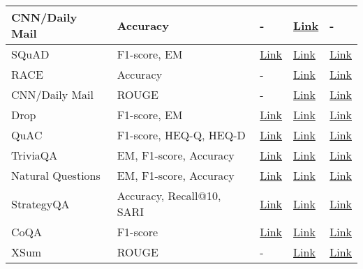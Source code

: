 \documentclass[conference]{IEEEtran}
\begin{document}
\begin{table*}
\begin{tabular}{|m{2.5cm}|m{4cm}|m{2cm}|m{2cm}|m{2cm}|}
        CNN/Daily Mail \cite{chen2016thorough} & Accuracy & - & \href{https://github.com/danqi/rc-cnn-dailymail}{Link}  & - \\ \hline
        SQuAD &  F1-score, EM  & \href{https://rajpurkar.github.io/SQuAD-explorer/ }{Link} & \href{https://rajpurkar.github.io/SQuAD-explorer/ }{Link} &  \href{https://paperswithcode.com/dataset/squad}{Link}  \\ \hline
        RACE & Accuracy &  - & \href{https://www.cs.cmu.edu/\~glai1/data/race/}{Link} & \href{https://paperswithcode.com/sota/reading-comprehension-on-race}{Link}  \\ \hline
        CNN/Daily Mail \cite{nallapati-etal-2016-abstractive} & ROUGE &  - & \href{https://github.com/abisee/cnn-dailymail}{Link}  & \href{https://paperswithcode.com/sota/abstractive-text-summarization-on-cnn-daily}{Link} \\ \hline
        Drop &  F1-score, EM  &  \href{https://leaderboard.allenai.org/drop/submissions/public}{Link}  & \href{https://allenai.org/data/drop}{Link}  & \href{https://paperswithcode.com/sota/question-answering-on-drop-test}{Link}  \\ \hline
        QuAC &  F1-score, HEQ-Q, HEQ-D  &  \href{https://quac.ai/}{Link}  & \href{https://quac.ai/}{Link}  & \href{https://paperswithcode.com/sota/question-answering-on-quac}{Link}\\ \hline
        TriviaQA &  EM, F1-score, Accuracy  &  \href{https://competitions.codalab.org/competitions/17208\#results}{Link} &\href{https://nlp.cs.washington.edu/triviaqa/}{Link}  & \href{https://paperswithcode.com/sota/question-answering-on-triviaqa}{Link}  \\ \hline
        Natural Questions &  EM, F1-score, Accuracy  &  \href{https://ai.google.com/research/NaturalQuestions}{Link}  & \href{https://ai.google.com/research/NaturalQuestions}{Link} & \href{https://paperswithcode.com/sota/question-answering-on-natural-questions}{Link}  \\ \hline
        StrategyQA &  Accuracy, Recall@10, SARI  &  \href{https://leaderboard.allenai.org/strategyqa/submissions/public}{Link} & \href{https://allenai.org/data/strategyqa}{Link} & \href{https://paperswithcode.com/sota/question-answering-on-strategyqa}{Link} \\ \hline
        CoQA & F1-score &  \href{https://stanfordnlp.github.io/coqa/}{Link} & \href{https://stanfordnlp.github.io/coqa/}{Link}  & \href{https://paperswithcode.com/dataset/coqa}{Link} \\ \hline
        XSum & ROUGE &  - & \href{https://github.com/EdinburghNLP/XSum}{Link}  & \href{https://paperswithcode.com/sota/text-summarization-on-x-sum}{Link}  \\ \hline

\end{tabular}
\end{table*}
\end{document}
